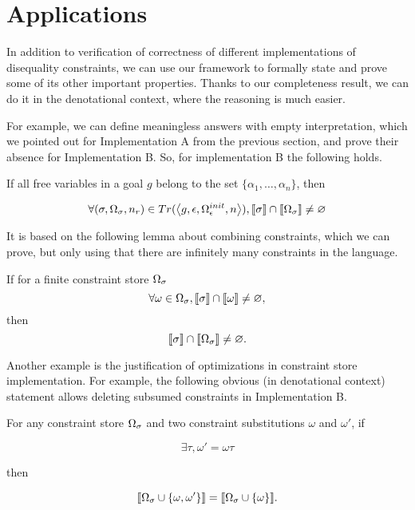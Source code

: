 \section{Applications}

In addition to verification of correctness of different implementations of disequality constraints, we can use our framework to formally
state and prove some of its other important properties. Thanks to our completeness result, we can do it in the denotational context,
where the reasoning is much easier.

For example, we can define meaningless answers with empty interpretation, which we pointed out for Implementation A from the previous section,
and prove their absence for Implementation B.
So, for implementation B the following holds.

\begin{lemma}
If all free variables in a goal $g$ belong to the set $\{\alpha_1,\dots,\alpha_n\}$, then

\[ \forall (\sigma, \Omega_\sigma, n_r) \in Tr(\left<{g, \epsilon, \Omega_\epsilon^{init}, n}\right>), \llbracket{\sigma}\rrbracket \cap \llbracket{\Omega_\sigma}\rrbracket \neq \varnothing \]
\end{lemma}

It is based on the following lemma about combining constraints, which we can prove, but only using that there are infinitely many constraints in the language.

\begin{lemma}
If for a finite constraint store $\Omega_\sigma$
\[ \forall \omega \in \Omega_\sigma,  \llbracket{\sigma}\rrbracket \cap \llbracket{\omega}\rrbracket \neq \varnothing, \]
then
\[ \llbracket{\sigma}\rrbracket \cap \llbracket{\Omega_\sigma}\rrbracket \neq \varnothing. \]
\end{lemma}

Another example is the justification of optimizations in constraint store implementation. For example, the following obvious (in denotational context) statement
allows deleting subsumed constraints in Implementation B.

\begin{lemma}
For any constraint store $\Omega_\sigma$ and two constraint substitutions $\omega$ and $\omega'$, if

\[ \exists \tau, \omega' = \omega \tau \]

then

\[ \llbracket{\Omega_\sigma \cup \{\omega, \omega'\}}\rrbracket = \llbracket{\Omega_\sigma \cup \{\omega\}}\rrbracket. \]
\end{lemma}
